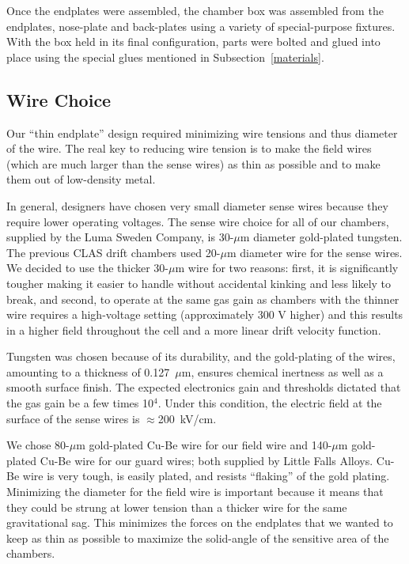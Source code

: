 Once the endplates were assembled, the chamber box was assembled from the
endplates, nose-plate and back-plates using a variety of special-purpose
fixtures.  With the box held in its final configuration, parts were bolted
and glued into place using the special glues mentioned in Subsection~\ref{materials}.



\subsection{Wire Choice}

Our ``thin endplate'' design required minimizing wire tensions and
thus diameter of the wire.  The real key to reducing wire tension is to
make the field wires (which are much larger than the sense wires) as 
thin as possible and to make them out of low-density metal.  

In general, designers have chosen very small diameter sense wires because they
require lower operating voltages.
The sense wire choice for all of our chambers, supplied by the Luma
Sweden Company, is 30-$\mu$m diameter gold-plated tungsten.  
The previous CLAS drift chambers used 20-$\mu$m diameter wire for the
sense wires.  We decided to use the thicker 30-$\mu$m wire for two 
reasons: first, it is significantly tougher making it easier to handle without
accidental kinking and less likely to break, and second, to operate at the same 
gas gain as chambers with the thinner wire requires a high-voltage setting 
(approximately 300 V higher) and this results in a higher field throughout the cell
and a more linear drift velocity function.  

Tungsten was chosen because of its durability, 
and the gold-plating of the wires, amounting to a thickness of 0.127~$\mu$m, 
ensures chemical inertness as well as a smooth surface finish.  The expected 
electronics gain and thresholds dictated that the gas gain be a few times 
10$^4$.  Under this condition, the electric field at the surface of the sense 
wires is $\approx$200~kV/cm.  

We chose 80-$\mu$m gold-plated Cu-Be wire for our field wire and
140-$\mu$m gold-plated Cu-Be wire for our guard wires; both supplied
by Little Falls Alloys.
Cu-Be wire is very tough, is easily plated, and resists ``flaking'' of the gold
plating. 
Minimizing the diameter for the field wire is important because it means that they 
could be strung at lower tension than a thicker wire for the same gravitational sag.  
This minimizes the forces on the endplates that we wanted to keep as 
thin as possible to maximize the solid-angle of the sensitive area of
the chambers.


